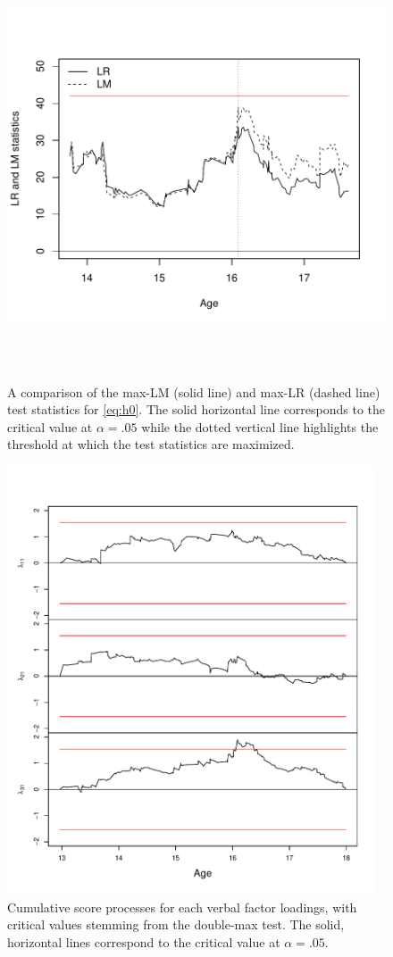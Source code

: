 \documentclass[man]{apa}
\begin{document}
\begin{figure}
\caption{A comparison of the max-LM (solid line) and max-LR (dashed line) test
  statistics for \eqref{eq:h0}.  The solid horizontal line
  corresponds to the critical value at $\alpha=.05$ while the dotted vertical
  line highlights the threshold at which the test statistics are maximized.}
\label{fig:lrlm}
\includegraphics[height=5in]{lmlr_19.pdf}
\end{figure}

\begin{figure}
\caption{Cumulative score processes for each verbal factor
  loadings, with critical values stemming from the double-max test. 
  The solid, horizontal lines
  correspond to the critical value at $\alpha=.05$.}
\label{fig:lambdas}
\includegraphics[height=5in]{gefp_lambdas.pdf}
\end{figure}
\end{document}
